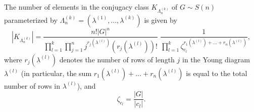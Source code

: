 \documentclass[12pt]{amsart}
\theoremstyle{definition}
\numberwithin{equation}{section}
\begin{document}
The number of elements in the conjugacy class $K_{\Lambda^{(k)}_n}$ of $G\sim S(n)$ parameterized by
$\Lambda_n^{(k)}=\left(\lambda^{(1)},\ldots,\lambda^{(k)}\right)$ is given by
\begin{equation}\label{TheSizeOfTheConjugacyClass}
\left|K_{\Lambda_n^{(k)}}\right|=\frac{n!|G|^n}{\prod\limits_{l=1}^k\prod\limits_{j=1}^nj^{r_j\left(\lambda^{(l)}\right)}
\left(r_j\left(\lambda^{(l)}\right)\right)!}\;\frac{1}{\prod\limits_{l=1}^k\zeta_{c_l}^{r_1\left(\lambda^{(l)}\right)+\ldots+r_n\left(\lambda^{(l)}\right)}},
\end{equation}
where $r_j\left(\lambda^{(l)}\right)$ denotes the number of rows of length $j$ in the Young diagram $\lambda^{(l)}$
(in particular, the sum $r_1\left(\lambda^{(l)}\right)+\ldots+r_n\left(\lambda^{(l)}\right)$ is equal to the total number of rows in $\lambda^{(l)}$), and
\begin{equation}\label{zetal}
\zeta_{c_l}=\frac{|G|}{|c_l|}.
\end{equation}
\end{document}
